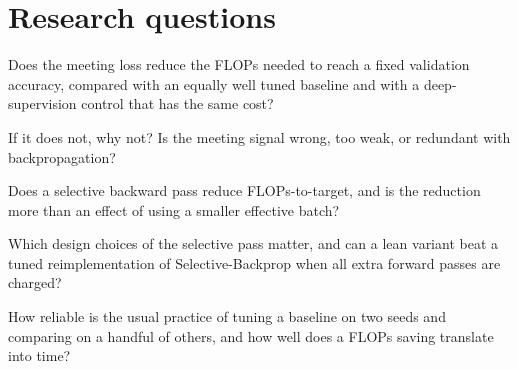 \section{Research questions}
\begin{description}[leftmargin=2.6em,style=nextline]
\item[RQ1] Does the meeting loss reduce the FLOPs needed to reach a fixed validation accuracy, compared with an equally well tuned baseline and with a deep-supervision control that has the same cost?
\item[RQ2] If it does not, why not? Is the meeting signal wrong, too weak, or redundant with backpropagation?
\item[RQ3] Does a selective backward pass reduce FLOPs-to-target, and is the reduction more than an effect of using a smaller effective batch?
\item[RQ4] Which design choices of the selective pass matter, and can a lean variant beat a tuned reimplementation of Selective-Backprop when all extra forward passes are charged?
\item[RQ5] How reliable is the usual practice of tuning a baseline on two seeds and comparing on a handful of others, and how well does a FLOPs saving translate into time?
\end{description}

